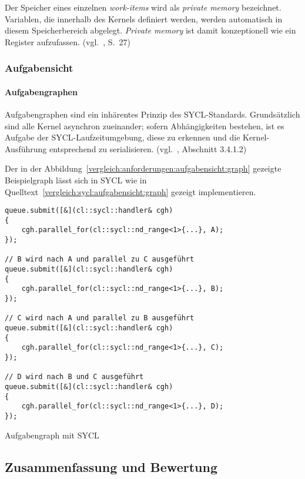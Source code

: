 Der Speicher eines einzelnen \textit{work-items} wird als
\textit{private memory} bezeichnet. Variablen, die innerhalb des Kernels
definiert werden, werden automatisch in diesem Speicherbereich abgelegt.
\textit{Private memory} ist damit konzeptionell wie ein Register aufzufassen.
(vgl.~\cite{syclspec}, S.\ 27)

\subsubsection{Aufgabensicht}
\label{vergleich:sycl:aufgabensicht}

\paragraph{Aufgabengraphen}

Aufgabengraphen sind ein inhärentes Prinzip des SYCL-Standards. Grundsätzlich
sind alle Kernel asynchron zueinander; sofern Abhängigkeiten bestehen, ist es
Aufgabe der SYCL-Laufzeitumgebung, diese zu erkennen und die Kernel-Ausführung
entsprechend zu serialisieren. (vgl.~\cite{syclspec}, Abschnitt 3.4.1.2)

Der in der Abbildung~\ref{vergleich:anforderungen:aufgabensicht:graph} gezeigte
Beispielgraph lässt sich in SYCL wie in
Quelltext~\ref{vergleich:sycl:aufgabensicht:graph} gezeigt implementieren.

\begin{code}
    \begin{verbatim}
queue.submit([&](cl::sycl::handler& cgh)
{
    cgh.parallel_for(cl::sycl::nd_range<1>{...}, A);
});

// B wird nach A und parallel zu C ausgeführt
queue.submit([&](cl::sycl::handler& cgh)
{
    cgh.parallel_for(cl::sycl::nd_range<1>{...}, B);
});

// C wird nach A und parallel zu B ausgeführt
queue.submit([&](cl::sycl::handler& cgh)
{
    cgh.parallel_for(cl::sycl::nd_range<1>{...}, C);
});

// D wird nach B und C ausgeführt
queue.submit([&](cl::sycl::handler& cgh)
{
    cgh.parallel_for(cl::sycl::nd_range<1>{...}, D);
});
    \end{verbatim}
    \caption{Aufgabengraph mit SYCL}
    \label{vergleich:sycl:aufgabensicht:graph}
\end{code}

\subsection{Zusammenfassung und Bewertung}
\label{vergleich:zusammenfassung}

